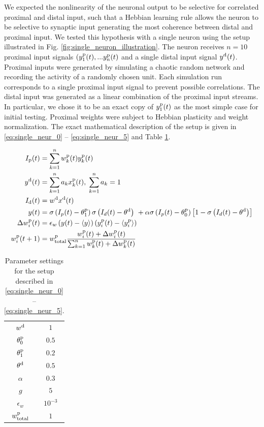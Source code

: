 \documentclass[10pt,a4paper,draft]{article}
\begin{document}
We expected the nonlinearity of the neuronal output to be selective for correlated proximal and distal input, such that a Hebbian learning rule allows the neuron to be selective to synaptic input generating the most coherence between distal and proximal input. We tested this hypothesis with a single neuron using the setup illustrated in Fig. \ref{fig:single_neuron_illustration}. The neuron receives $n=10$ proximal input signals $(y^{\rm p}_1(t),...y^{\rm p}_n(t)$ and a single distal input signal $y^{\rm d}(t)$. Proximal inputs were generated by simulating a chaotic random network and recording the activity of a randomly chosen unit. Each simulation run corresponds to a single proximal input signal to prevent possible correlations. The distal input was generated as a linear combination of the proximal input streams. In particular, we chose it to be an exact copy of $y^{\rm p}_1(t)$ as the most simple case for initial testing. Proximal weights were subject to Hebbian plasticity and weight normalization. The exact mathematical description of the setup is given in \eqref{eq:single_neur_0} -- \eqref{eq:single_neur_5} and Table \ref{tab:single_neuron_parameters}.

\begin{align}
I_{\rm p} (t) &= \sum_{k=1}^n w^{\rm p}_{k} (t) y^{\rm p}_{k} (t) \label{eq:single_neur_0} \\
y^{\rm d} (t) &= \sum_{k=1}^n a_k x^{\rm p}_{k} (t), \; \sum_{k=1}^n a_k = 1 \label{eq:single_neur_1} \\
I_{\rm d} (t) &= w^{\rm d} x^{\rm d} (t) \label{eq:single_neur_2} \\
y(t) &= \sigma\left(I_p(t)-\theta^{\rm p}_{1}\right) \sigma\left(I_d(t)-\theta^{\rm d}\right)\ +\alpha\sigma\left(I_p(t)-\theta^{\rm p}_{0}\right)\left[ 1 - \sigma\left(I_d(t)-\theta^{\rm d}\right)\right] \label{eq:single_neur_3} \\
\Delta w^{\rm p}_{i} (t) &= \epsilon_w  \left(y(t)-\langle y \rangle\right)\left(y^{\rm p}_{i}(t)-\langle y^{\rm p}_{i} \rangle \right) \label{eq:single_neur_4} \\
w^{\rm p}_{i}(t+1) &= w^{\rm p}_{\rm total} \frac{w^{\rm p}_{i}(t) + \Delta w^{\rm p}_{i}(t)}{\sum_{k=1}^n w^{\rm p}_{k}(t) + \Delta w^{\rm p}_{k}(t)} \label{eq:single_neur_5}
\end{align}

\begin{table}
\centering
\caption{Parameter settings for the setup described in \eqref{eq:single_neur_0} -- \eqref{eq:single_neur_5}.}
\begin{tabular}{|c|c|}
\hline
$w^{\rm d}$ & $1$ \\
$\theta^{\rm p}_{0}$ & $0.5$ \\
$\theta^{\rm p}_{1}$ & $0.2$ \\
$\theta^{\rm d}$ & $0.5$ \\
$\alpha$ & $0.3$ \\
$g$ & $5$ \\
$\epsilon_w$ & $10^{-3}$ \\
$w^{\rm p}_{\rm total}$ & $1$ \\
\hline
\end{tabular}
\label{tab:single_neuron_parameters}
\end{table}
\end{document}
